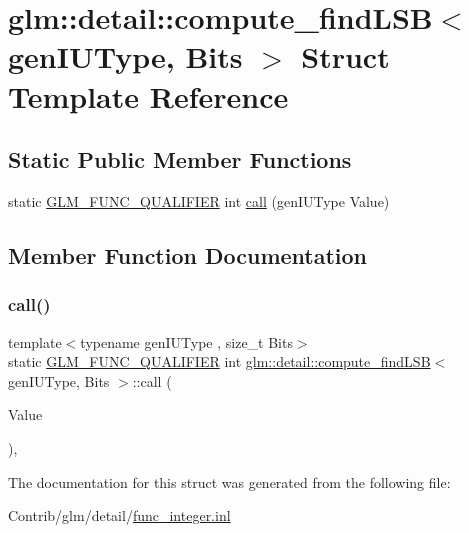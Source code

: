 \hypertarget{structglm_1_1detail_1_1compute__find_l_s_b}{}\section{glm\+:\+:detail\+:\+:compute\+\_\+find\+L\+SB$<$ gen\+I\+U\+Type, Bits $>$ Struct Template Reference}
\label{structglm_1_1detail_1_1compute__find_l_s_b}
\subsection*{Static Public Member Functions}
\begin{DoxyCompactItemize}
\item 
static \mbox{\hyperlink{setup_8hpp_a33fdea6f91c5f834105f7415e2a64407}{G\+L\+M\+\_\+\+F\+U\+N\+C\+\_\+\+Q\+U\+A\+L\+I\+F\+I\+ER}} int \mbox{\hyperlink{structglm_1_1detail_1_1compute__find_l_s_b_a1c0ec72e2bcf35a3109e85cfc536400b}{call}} (gen\+I\+U\+Type Value)
\end{DoxyCompactItemize}


\subsection{Member Function Documentation}
\mbox{\label{structglm_1_1detail_1_1compute__find_l_s_b_a1c0ec72e2bcf35a3109e85cfc536400b}} 
\subsubsection{\texorpdfstring{call()}{call()}}
{\footnotesize\ttfamily template$<$typename gen\+I\+U\+Type , size\+\_\+t Bits$>$ \\
static \mbox{\hyperlink{setup_8hpp_a33fdea6f91c5f834105f7415e2a64407}{G\+L\+M\+\_\+\+F\+U\+N\+C\+\_\+\+Q\+U\+A\+L\+I\+F\+I\+ER}} int \mbox{\hyperlink{structglm_1_1detail_1_1compute__find_l_s_b}{glm\+::detail\+::compute\+\_\+find\+L\+SB}}$<$ gen\+I\+U\+Type, Bits $>$\+::call (\begin{DoxyParamCaption}\item[{gen\+I\+U\+Type}]{Value }\end{DoxyParamCaption})\hspace{0.3cm}{\ttfamily [inline]}, {\ttfamily [static]}}



The documentation for this struct was generated from the following file\+:\begin{DoxyCompactItemize}
\item 
Contrib/glm/detail/\mbox{\hyperlink{func__integer_8inl}{func\+\_\+integer.\+inl}}\end{DoxyCompactItemize}
